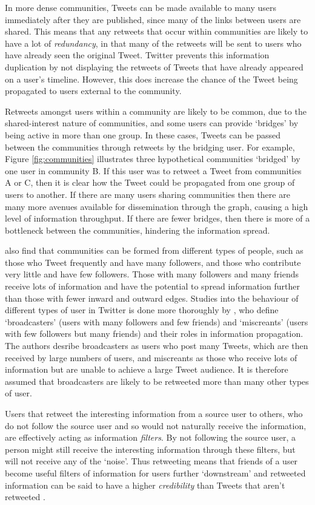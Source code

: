 In more dense communities, Tweets can be made available to many users immediately after they are published, since many of the links between users are shared. This means that any retweets that occur within communities are likely to have a lot of \textit{redundancy}, in that many of the retweets will be sent to users who have already seen the original Tweet. Twitter prevents this information duplication by not displaying the retweets of Tweets that have already appeared on a user's timeline. However, this does increase the chance of the Tweet being propagated to users external to the community.

Retweets amongst users within a community are likely to be common, due to the shared-interest nature of communities, and some users can provide `bridges' by being active in more than one group. In these cases, Tweets can be passed between the communities through retweets by the bridging user. For example, Figure \ref{fig:communities} illustrates three hypothetical communities `bridged' by one user in community B. If this user was to retweet a Tweet from communities A or C, then it is clear how the Tweet could be propagated from one group of users to another. If there are many users sharing communities then there are many more avenues available for dissemination through the graph, causing a high level of information throughput. If there are fewer bridges, then there is more of a bottleneck between the communities, hindering the information spread.

\citet{java07} also find that communities can be formed from different types of people, such as those who Tweet frequently and have many followers, and those who contribute very little and have few followers. Those with many followers and many friends receive lots of information and have the potential to spread information further than those with fewer inward and outward edges. Studies into the behaviour of different types of user in Twitter is done more thoroughly by \citet{krishnamurthy08}, who define `broadcasters' (users with many followers and few friends) and `miscreants' (users with few followers but many friends) and their roles in information propagation. The authors desribe broadcasters as users who post many Tweets, which are then received by large numbers of users, and miscreants as those who receive lots of information but are unable to achieve a large Tweet audience. It is therefore assumed that broadcasters are likely to be retweeted more than many other types of user.

Users that retweet the interesting information from a source user to others, who do not follow the source user and so would not naturally receive the information, are effectively acting as information \textit{filters}. By not following the source user, a person might still receive the interesting information through these filters, but will not receive any of the `noise'. Thus retweeting means that friends of a user become useful filters of information for users further `downstream'  and retweeted information can be said to have a higher \textit{credibility} than Tweets that aren't retweeted \cite{castillo11}.


